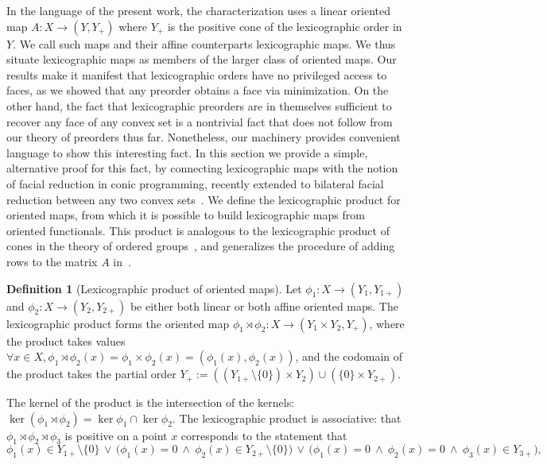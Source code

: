\documentclass{article}
\theoremstyle{plain}
\theoremstyle{definition}
\newtheorem{definition}[definition]{Definition}
\theoremstyle{remark}
\begin{document}
In the language of the present work,
the characterization uses a linear oriented map $A:X \to (Y, Y_+)$ where
$Y_+$ is the positive cone of the lexicographic order in $Y$. We call such
maps and their affine counterparts lexicographic maps.
We thus situate lexicographic maps as members of the larger class of oriented maps.
Our results make it manifest that lexicographic orders have no privileged access to faces, as
we showed that any preorder obtains a face via minimization.
On the other hand, the fact that lexicographic preorders are in themselves
sufficient to recover any face of any convex set is a nontrivial fact that
does not follow from our theory of preorders thus far. Nonetheless, our machinery provides convenient
language to show this interesting fact. In this section we provide
a simple, alternative proof for this fact, by connecting
lexicographic maps with the notion of facial reduction in conic programming,
recently extended to bilateral facial reduction between any two convex 
sets~\cite{scottBilateralFacialReduction2026, linFacialReductionNice2025}.
We define the lexicographic product for oriented maps, from which it is possible to build lexicographic maps from oriented functionals. 
This product is analogous to the lexicographic product of cones in the theory of ordered groups~\cite{fuchsPartiallyOrderedAlgebraic2014}, and generalizes the procedure
of adding rows to the matrix $A$ in~\cite{martinez-legaz_LEXICOGRAPHICALCHARACTERIZATIONFACES_}.
\begin{definition}[Lexicographic product of oriented maps]
\label{loc:lexicographic_product_of_oriented_maps.statement}
Let $\phi_1:X \to (Y_1, Y_{1+})$ and $\phi_2:X \to (Y_2, Y_{2+})$ be either both linear or both affine oriented maps. The lexicographic product forms the oriented map $\phi_1 \rtimes \phi_2:X \to (Y_1 \times Y_2, Y_+)$, where the product takes values $\forall x \in  X,  \phi_1 \rtimes \phi_2(x) = \phi_1 \times \phi_2 (x) = (\phi_1(x),  \phi_2(x))$, and the codomain of the product takes the partial order $Y_+ := ((Y_{1+} \setminus \{0\}) \times Y_2) \cup (\{0\} \times Y_{2+})$. 
\end{definition}
The kernel of the product is the intersection of the kernels: $\ker(\phi_1 \rtimes \phi_2) = \ker\phi_1 \cap \ker\phi_2$.
The lexicographic product is associative: that
$\phi_1 \rtimes \phi_2 \rtimes \phi_3$ is positive on a point $x$ corresponds to the statement that 
\begin{equation*}
\phi_1(x) \in Y_{1+} \setminus \{0\} \,  \lor \, \bigl( \phi_1(x) = 0 \ \land\ \phi_2(x) \in Y_{2+} \setminus \{0\} \bigr) \, \lor \, \bigl( \phi_1(x) = 0 \ \land\ \phi_2(x) = 0 \ \land\ \phi_3(x) \in Y_{3+} \bigr),
\end{equation*}
\end{document}
